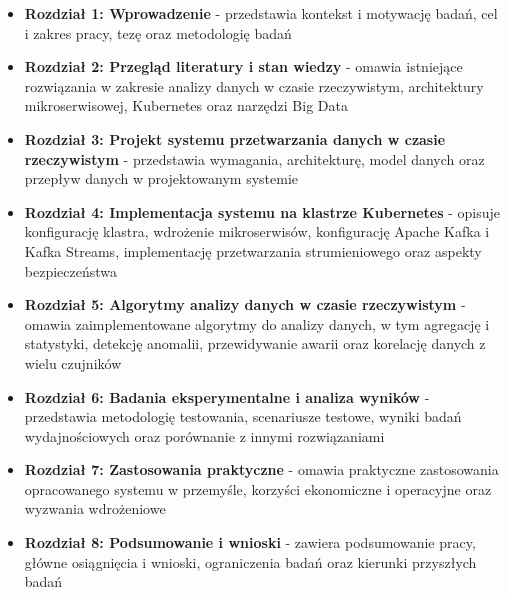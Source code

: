 \begin{itemize}
    \item \textbf{Rozdział 1: Wprowadzenie} - przedstawia kontekst i motywację badań, cel i zakres pracy, tezę oraz metodologię badań
    \item \textbf{Rozdział 2: Przegląd literatury i stan wiedzy} - omawia istniejące rozwiązania w zakresie analizy danych w czasie rzeczywistym, architektury mikroserwisowej, Kubernetes oraz narzędzi Big Data
    \item \textbf{Rozdział 3: Projekt systemu przetwarzania danych w czasie rzeczywistym} - przedstawia wymagania, architekturę, model danych oraz przepływ danych w projektowanym systemie
    \item \textbf{Rozdział 4: Implementacja systemu na klastrze Kubernetes} - opisuje konfigurację klastra, wdrożenie mikroserwisów, konfigurację Apache Kafka i Kafka Streams, implementację przetwarzania strumieniowego oraz aspekty bezpieczeństwa
    \item \textbf{Rozdział 5: Algorytmy analizy danych w czasie rzeczywistym} - omawia zaimplementowane algorytmy do analizy danych, w tym agregację i statystyki, detekcję anomalii, przewidywanie awarii oraz korelację danych z wielu czujników
    \item \textbf{Rozdział 6: Badania eksperymentalne i analiza wyników} - przedstawia metodologię testowania, scenariusze testowe, wyniki badań wydajnościowych oraz porównanie z innymi rozwiązaniami
    \item \textbf{Rozdział 7: Zastosowania praktyczne} - omawia praktyczne zastosowania opracowanego systemu w przemyśle, korzyści ekonomiczne i operacyjne oraz wyzwania wdrożeniowe
    \item \textbf{Rozdział 8: Podsumowanie i wnioski} - zawiera podsumowanie pracy, główne osiągnięcia i wnioski, ograniczenia badań oraz kierunki przyszłych badań
\end{itemize} 